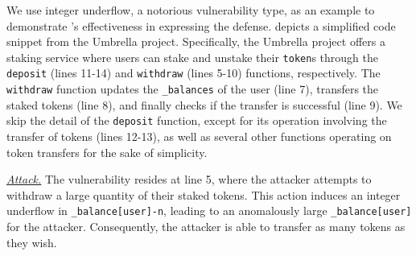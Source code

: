 % 




We use integer underflow, a notorious vulnerability type, as an example to demonstrate
\lang's effectiveness in expressing the defense. %
 depicts a simplified code snippet from the Umbrella project.
Specifically, the Umbrella project offers a staking service where users can stake and unstake their \texttt{token}s through the \texttt{deposit} (lines 11-14) and \texttt{withdraw} (lines 5-10) functions, respectively. 
The \texttt{withdraw} function 
updates the \texttt{\_balances} of the user (line 7), transfers the staked tokens (line 8), and finally checks if the transfer is successful (line 9). 
We skip the detail of the \texttt{deposit} function, except for its operation involving the transfer of tokens (lines 12-13), as well as several other functions operating on token transfers for the sake of simplicity.



\smallskip
\noindent
\underline{\textit{Attack.}}
The vulnerability resides at line 5, where the attacker attempts to withdraw a large quantity of their staked tokens. 
This action induces an integer underflow 
in \texttt{\_balance[user]-n}, leading to an anomalously large \texttt{\_balance[user]} for the attacker. 
Consequently, the attacker is able to transfer as many tokens as they wish. 

